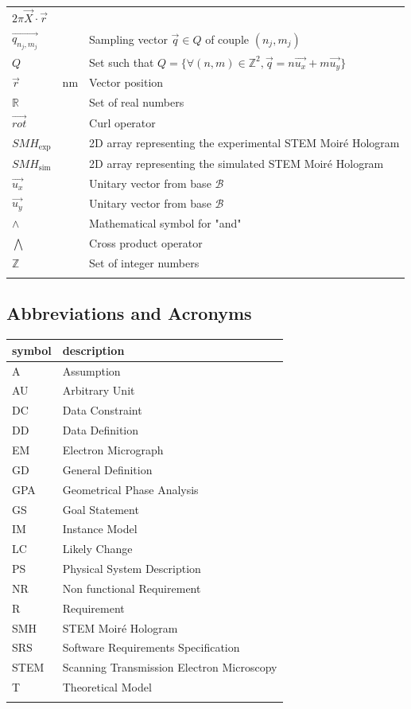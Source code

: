 \documentclass[12pt]{article}
\begin{document}
\begin{longtable*}{l l p{12cm}}
$2\pi\overrightarrow{X}\cdot\vec{r}$\\
$\overrightarrow{q_{n_j,m_j}}$ & & Sampling vector $\vec{q} \in Q$ of couple 
$(n_j,m_j)$\\
$Q$ & & Set such that $Q=\{\forall (n,m) \in \mathbb{Z}^{2}, 
\vec{q}=n\vec{u_x}+m\vec{u_y}\}$ \\
$\vec{r}$ & \si{\nano\meter} & Vector position \\
$\mathbb{R}$ & & Set of real numbers \\
$\overrightarrow{\mathit{rot}}$ & & Curl operator\\
$\mathit{SMH}_{\text{exp}}$ & & 2D array representing the experimental STEM 
Moir{\'e} Hologram \\
$\mathit{SMH}_{\text{sim}}$ & & 2D array representing the simulated STEM 
Moir{\'e} Hologram \\
$\vec{u_x}$ & & Unitary vector from base $\mathcal{B}$ \\
$\vec{u_y}$ & & Unitary vector from base $\mathcal{B}$ \\
$\wedge$ & & Mathematical symbol for "and"\\
$\bigwedge$ & & Cross product operator\\
$\mathbb{Z}$ & & Set of integer numbers\\
\bottomrule
\label{table_symbols_SRS}
\end{longtable*}

\subsection{Abbreviations and Acronyms}

\renewcommand{\arraystretch}{1.2}
\begin{tabular}{l l} 
  \toprule		
  \textbf{symbol} & \textbf{description}\\
  \midrule 
  A & Assumption\\
  AU & Arbitrary Unit\\
  DC & Data Constraint \\
  DD & Data Definition\\
  EM & Electron Micrograph \\
  GD & General Definition\\
  GPA & Geometrical Phase Analysis \\
  GS & Goal Statement\\
  IM & Instance Model\\
  LC & Likely Change\\
  PS & Physical System Description\\
  NR & Non functional Requirement\\
  R & Requirement\\
  SMH & STEM Moir{\'e} Hologram \\
  SRS & Software Requirements Specification\\
  STEM & Scanning Transmission Electron Microscopy \\
  T & Theoretical Model\\
  \bottomrule
  \label{table_acro_SRS}
\end{tabular}
\end{document}
